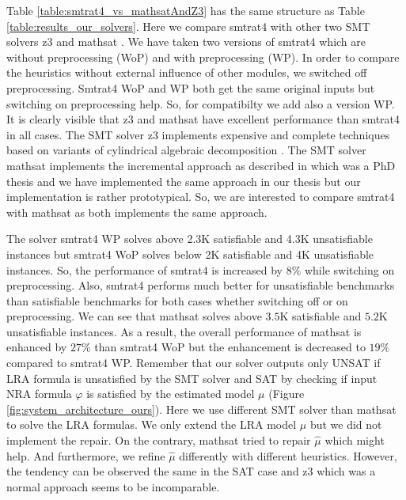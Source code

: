 \noindent Table \ref{table:smtrat4_vs_mathsatAndZ3} has the same structure as Table \ref{table:results_our_solvers}.
Here we compare smtrat4 with other two SMT solvers z3 \cite{10.1007/978-3-540-78800-3_24} and mathsat \cite{ 10.1007/978-3-642-36742-7_7}.
We have taken two versions of smtrat4 which are without preprocessing (WoP) and with preprocessing (WP).
In order to compare the heuristics without external influence of other modules, we switched off preprocessing.
Smtrat4 WoP and WP both get the same original inputs but switching on preprocessing help.
So, for compatibilty we add also a version WP.
It is clearly visible that z3 and mathsat have excellent performance than smtrat4 in all cases.
The SMT solver z3 implements expensive and complete techniques based on variants of cylindrical algebraic decomposition \cite{Cimatti:2018:ILS:3274693.3230639}.
The SMT solver mathsat implements the incremental approach as described in \cite{irfan2018incremental} which was a PhD thesis and we have implemented the same approach in our thesis but our implementation is rather prototypical.
So, we are interested to compare smtrat4 with mathsat as both implements the same approach.\newline

\noindent The solver smtrat4 WP solves above 2.3K satisfiable and 4.3K unsatisfiable instances but smtrat4 WoP solves below 2K satisfiable and 4K unsatisfiable instances.
So, the performance of smtrat4 is increased by $8\%$ while switching on preprocessing.
Also, smtrat4 performs much better for unsatisfiable benchmarks than satisfiable benchmarks for both cases whether switching off or on preprocessing.
We can see that mathsat solves above $3.5$K satisfiable and $5.2$K unsatisfiable instances.
As a result, the overall performance of mathsat is enhanced by $27\%$ than smtrat4 WoP but the enhancement is decreased to $19\%$ compared to smtrat4 WP.
Remember that our solver outputs only UNSAT if LRA formula is unsatisfied by the SMT solver and SAT by checking if input NRA formula $\varphi$ is satisfied by the estimated model $\mu$ (Figure \ref{fig:system_architecture_ours}).
Here we use different SMT solver than mathsat to solve the LRA formulas.
We only extend the LRA model $\hat{\mu}$ but we did not implement the repair.
On the contrary, mathsat tried to repair $\hat{\mu}$ which might help.
And furthermore, we refine $\hat{\mu}$ differently with different heuristics.
However, the tendency can be observed the same in the SAT case and z3 which was a normal approach seems to be incomparable.\newline

